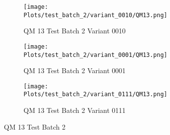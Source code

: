 \documentclass{DissertateFigs}
\begin{document}
\begin{figure}[t!]
\medskip

    \begin{subfigure}{0.47\textwidth}
    \texttt{[image: Plots/test\_batch\_2/variant\_0010/QM13.png]}
    \caption{QM 13 Test Batch 2 Variant 0010}
    \end{subfigure}
    \begin{subfigure}{0.47\textwidth}
    \texttt{[image: Plots/test\_batch\_2/variant\_0001/QM13.png]}
    \caption{QM 13 Test Batch 2 Variant 0001}
    \end{subfigure}

\medskip

    \begin{subfigure}{0.47\textwidth}
    \texttt{[image: Plots/test\_batch\_2/variant\_0111/QM13.png]}
    \caption{QM 13 Test Batch 2 Variant 0111}
    \end{subfigure}
\caption{QM 13 Test Batch 2}
    \end{figure}
\clearpage
\end{document}
